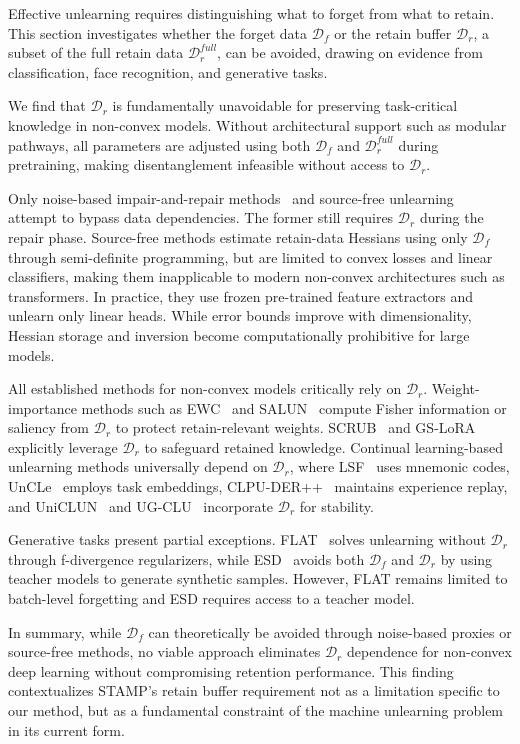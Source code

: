 Effective unlearning requires distinguishing what to forget from what to retain. This section investigates whether the forget data $\mathcal{D}_f$ or the retain buffer $\mathcal{D}_r$, a subset of the full retain data $\mathcal{D}_r^{\textit{full}}$, can be avoided, drawing on evidence from classification, face recognition, and generative tasks.

We find that $\mathcal{D}_r$ is fundamentally unavoidable for preserving task-critical knowledge in non-convex models. Without architectural support such as modular pathways, all parameters are adjusted using both $\mathcal{D}_f$ and $\mathcal{D}_r^{\textit{full}}$ during pretraining, making disentanglement infeasible without access to $\mathcal{D}_r$.

Only noise-based impair-and-repair methods~\citeauthor{tarun2023fast} and source-free unlearning~\citeauthor{ahmed2025towards} attempt to bypass data dependencies. The former still requires $\mathcal{D}_r$ during the repair phase. Source-free methods estimate retain-data Hessians using only $\mathcal{D}_f$ through semi-definite programming, but are limited to convex losses and linear classifiers, making them inapplicable to modern non-convex architectures such as transformers. In practice, they use frozen pre-trained feature extractors and unlearn only linear heads. While error bounds improve with dimensionality, Hessian storage and inversion become computationally prohibitive for large models.

All established methods for non-convex models critically rely on $\mathcal{D}_r$. Weight-importance methods such as EWC~\citeauthor{kirkpatrick2017overcoming} and SALUN~\citeauthor{fan2023salun} compute Fisher information or saliency from $\mathcal{D}_r$ to protect retain-relevant weights. SCRUB~\citeauthor{kurmanji2023towards} and GS-LoRA~\citeauthor{zhao2024continual} explicitly leverage $\mathcal{D}_r$ to safeguard retained knowledge. Continual learning-based unlearning methods universally depend on $\mathcal{D}_r$, where LSF~\citeauthor{shibata2021learning} uses mnemonic codes, UnCLe~\citeauthor{adhikari2025unlearning} employs task embeddings, CLPU-DER++~\citeauthor{liu2022continual} maintains experience replay, and UniCLUN~\citeauthor{chatterjee2024unified} and UG-CLU~\citeauthor{huang2025unified} incorporate $\mathcal{D}_r$ for stability.

Generative tasks present partial exceptions. FLAT~\citeauthor{wang2024llm} solves unlearning without $\mathcal{D}_r$ through f-divergence regularizers, while ESD~\citeauthor{gandikota2023erasing} avoids both $\mathcal{D}_f$ and $\mathcal{D}_r$ by using teacher models to generate synthetic samples. However, FLAT remains limited to batch-level forgetting and ESD requires access to a teacher model.

In summary, while $\mathcal{D}_f$ can theoretically be avoided through noise-based proxies or source-free methods, no viable approach eliminates $\mathcal{D}_r$ dependence for non-convex deep learning without compromising retention performance. This finding contextualizes STAMP's retain buffer requirement not as a limitation specific to our method, but as a fundamental constraint of the machine unlearning problem in its current form.